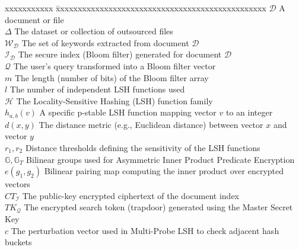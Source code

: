 \documentclass[BTech]{iiitdmdiss}
\begin{document}
\notation
\noindent 
\begin{singlespace}
\begin{tabbing}
xxxxxxxxxxx \= xxxxxxxxxxxxxxxxxxxxxxxxxxxxxxxxxxxxxxxxxxxxxxxx \kill
\textbf{$\mathcal{D}$} \> A document or file \\
\textbf{$\Delta$} \> The dataset or collection of outsourced files\\
\textbf{$\mathcal{W_D}$} \> The set of keywords extracted from document $\mathcal{D}$\\
\textbf{$\mathcal{I_D}$} \> The secure index (Bloom filter) generated for document $\mathcal{D}$\\
\textbf{$\mathcal{Q}$} \> The user's query transformed into a Bloom filter vector\\
\textbf{$m$} \> The length (number of bits) of the Bloom filter array\\
\textbf{$l$} \> The number of independent LSH functions used\\
\textbf{$\mathcal{H}$} \> The Locality-Sensitive Hashing (LSH) function family\\
\textbf{$h_{a,b}(v)$} \> A specific p-stable LSH function mapping vector $v$ to an integer\\
\textbf{$d(x, y)$} \> The distance metric (e.g., Euclidean distance) between vector $x$ and vector $y$\\
\textbf{$r_1, r_2$} \> Distance thresholds defining the sensitivity of the LSH functions\\
\textbf{$\mathbb{G}, \mathbb{G}_T$} \> Bilinear groups used for Asymmetric Inner Product Predicate Encryption \\
\textbf{$e(g_1, g_2)$} \> Bilinear pairing map computing the inner product over encrypted vectors \\
\textbf{$CT_{\mathcal{I}}$} \> The public-key encrypted ciphertext of the document index \\
\textbf{$TK_{\mathcal{Q}}$} \> The encrypted search token (trapdoor) generated using the Master Secret Key \\
\textbf{$c$} \> The perturbation vector used in Multi-Probe LSH to check adjacent hash buckets \\
\end{tabbing}
\end{singlespace}

\pagebreak
\clearpage

\pagestyle{fancy}
\fancyhf{}
\end{document}
